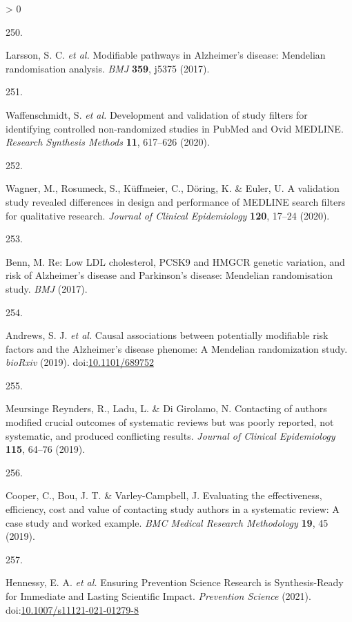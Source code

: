 \documentclass[a4paper, twoside]{templates/ociamthesis}
\newlength{\cslhangindent}
\newlength{\csllabelwidth}
\newenvironment{CSLReferences}[3] %
 {%
  \setlength{\parindent}{0pt}
  \ifodd #1 \everypar{\setlength{\hangindent}{\cslhangindent}}\ignorespaces\fi
  \ifnum #2 > 0
  \setlength{\parskip}{#2\baselineskip}
  \fi
 }%
 {}
\newcommand{\CSLLeftMargin}[1]{\parbox[t]{\maxof{\widthof{#1}}{\csllabelwidth}}{#1}}
\newcommand{\CSLRightInline}[1]{\parbox[t]{\linewidth - \csllabelwidth}{#1}}
\begin{document}
\begin{CSLReferences}{0}{0}
\leavevmode\hypertarget{ref-larsson2017b}{}%
\CSLLeftMargin{250. }
\CSLRightInline{Larsson, S. C. \emph{et al.} Modifiable pathways in {Alzheimer}'s disease: Mendelian randomisation analysis. \emph{BMJ} \textbf{359}, j5375 (2017).}

\leavevmode\hypertarget{ref-waffenschmidt2020}{}%
\CSLLeftMargin{251. }
\CSLRightInline{Waffenschmidt, S. \emph{et al.} Development and validation of study filters for identifying controlled non-randomized studies in {PubMed} and {Ovid MEDLINE}. \emph{Research Synthesis Methods} \textbf{11}, 617--626 (2020).}

\leavevmode\hypertarget{ref-wagner2020}{}%
\CSLLeftMargin{252. }
\CSLRightInline{Wagner, M., Rosumeck, S., Küffmeier, C., Döring, K. \& Euler, U. A validation study revealed differences in design and performance of {MEDLINE} search filters for qualitative research. \emph{Journal of Clinical Epidemiology} \textbf{120}, 17--24 (2020).}

\leavevmode\hypertarget{ref-benn2017a}{}%
\CSLLeftMargin{253. }
\CSLRightInline{Benn, M. Re: Low {LDL} cholesterol, {PCSK9} and {HMGCR} genetic variation, and risk of {Alzheimer}'s disease and {Parkinson}'s disease: Mendelian randomisation study. \emph{BMJ} (2017).}

\leavevmode\hypertarget{ref-andrews2019b}{}%
\CSLLeftMargin{254. }
\CSLRightInline{Andrews, S. J. \emph{et al.} Causal associations between potentially modifiable risk factors and the {Alzheimer}'s disease phenome: A {Mendelian} randomization study. \emph{bioRxiv} (2019). doi:\href{https://doi.org/10.1101/689752}{10.1101/689752}}

\leavevmode\hypertarget{ref-meursingereynders2019}{}%
\CSLLeftMargin{255. }
\CSLRightInline{Meursinge Reynders, R., Ladu, L. \& Di Girolamo, N. Contacting of authors modified crucial outcomes of systematic reviews but was poorly reported, not systematic, and produced conflicting results. \emph{Journal of Clinical Epidemiology} \textbf{115}, 64--76 (2019).}

\leavevmode\hypertarget{ref-cooper2019}{}%
\CSLLeftMargin{256. }
\CSLRightInline{Cooper, C., Bou, J. T. \& Varley-Campbell, J. Evaluating the effectiveness, efficiency, cost and value of contacting study authors in a systematic review: A case study and worked example. \emph{BMC Medical Research Methodology} \textbf{19}, 45 (2019).}

\leavevmode\hypertarget{ref-hennessy2021}{}%
\CSLLeftMargin{257. }
\CSLRightInline{Hennessy, E. A. \emph{et al.} Ensuring {Prevention Science Research} is {Synthesis}-{Ready} for {Immediate} and {Lasting Scientific Impact}. \emph{Prevention Science} (2021). doi:\href{https://doi.org/10.1007/s11121-021-01279-8}{10.1007/s11121-021-01279-8}}


\end{CSLReferences}
\end{document}
